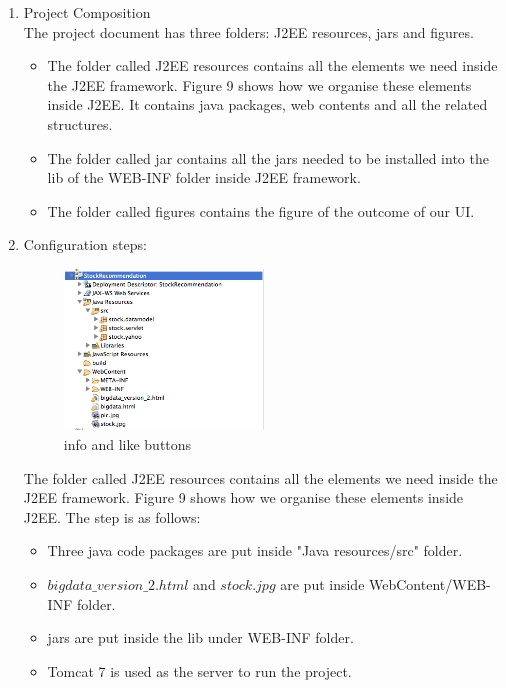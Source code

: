 \documentclass[10pt, conference, compsocconf]{IEEEtran}
\begin{document}
\begin{enumerate}[label=\Alph*]

\item Project Composition\\

The project document has three folders: J2EE resources, jars and figures.\\

\begin{itemize}
\item The folder called J2EE resources contains all the elements we need inside the J2EE framework. Figure  9 shows how we organise these elements inside J2EE. It contains java packages, web contents and all the related structures.
\item The folder called jar contains all the jars needed to be installed into the lib of the WEB-INF folder inside J2EE framework.
\item The folder called figures contains the figure of the outcome of our UI.\\
\end{itemize}





\item Configuration steps:\\

 \begin{figure}[!h]
            \centering
           \includegraphics[width=0.5\textwidth]{figures/j2ee.jpg}
           \caption{info and like buttons}
          \vspace{0.1cm}
    \end{figure}
    
The folder called J2EE resources contains all the elements we need inside the J2EE framework. Figure  9 shows how we organise these elements inside J2EE. The step is as follows:\\
\begin{itemize}
\item Three java code packages are put inside "Java resources/src" folder. 
\item $bigdata\_version\_2.html$ and $stock.jpg$ are put inside WebContent/WEB-INF folder. 
\item jars are put inside the lib under WEB-INF folder.
\item Tomcat 7 is used as the server to run the project.\\
\end{itemize}


\end{enumerate}
\end{document}
